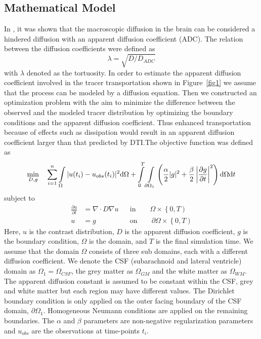 \documentclass[11pt,a4paper]{article}
\newcommand{\lars}[1]{\textcolor{magenta}{#1}}
\begin{document}
\subsection{Mathematical Model}
In \citet{sykova2008diffusion}, it was shown that the macroscopic diffusion in the brain can be considered a hindered diffusion with an apparent diffusion coefficient (ADC). The relation between the diffusion coefficients were defined as 
\begin{equation}
 \lambda =  \sqrt {D/D_{ADC}}
\label{tortuosity}
\end{equation}
with $\lambda$ denoted as the tortuosity.
In order to estimate the apparent diffusion coefficient involved in the tracer transportation shown in Figure~\ref{fig1} we assume that the process can be modeled by a diffusion equation. 
Then we constructed an optimization problem with the aim to minimize the difference between the observed and the modeled tracer distribution by optimizing the boundary conditions and the apparent diffusion coefficient.%
Thus enhanced transportation because of effects such as dissipation would result in an apparent diffusion coefficient larger than that predicted by DTI.The objective function was defined as 
\begin{equation}
\min_{D,g} \quad \sum\limits_{i=1}\sp{n} \int\limits_{\Omega} |u(t_i) - u_{obs}(t_i)|\sp{2} \mathrm{d}\Omega + \int\limits_{0}\sp{T} \int\limits_{\partial \Omega_1} \left( \frac{\alpha}{2} | g |\sp{2} + \frac{\beta}{2} \left| \frac{\partial g}{\partial t} \right|\sp{2} \right) \mathrm{d}\Omega \mathrm{d}t  
\label{EQ::objf}
\end{equation}
subject to   
\begin{equation}
\begin{aligned}
\frac{\partial u}{\partial t} &= \nabla \cdot  D \nabla u && \text{in} \qquad \Omega \times \left\lbrace 0 , T \right)  \\
u&=g && \text{on} \qquad \partial\Omega  \times \left\lbrace 0 , T \right) 
\end{aligned}
\label{Eq::PDE}
\end{equation}
Here, $u$ is the contrast distribution, $D$ is the apparent diffusion 
coefficient, $g$ is the boundary condition, $\Omega$ is the domain, and $T$ is the final simulation time. We assume that the domain $\Omega$ consists of three sub domains, each with a different diffusion coefficient. We denote the CSF (subarachnoid and lateral ventricle) domain as $\Omega_1=\Omega_{CSF}$, the grey matter as $\Omega_{GM}$ and the white matter as $\Omega_{WM}$. 
The apparent
diffusion constant is assumed to be constant within the CSF, grey and 
white matter but each region may have different values.  
The Dirichlet boundary condition is only applied on the outer facing boundary of the CSF domain, $\partial \Omega_1$. Homogeneous Neumann conditions are applied on the remaining boundaries.
The $\alpha$ and $\beta$ parameters are non-negative regularization parameters 
and $u_{obs}$ are the observations at time-points $t_i$. 
\end{document}
